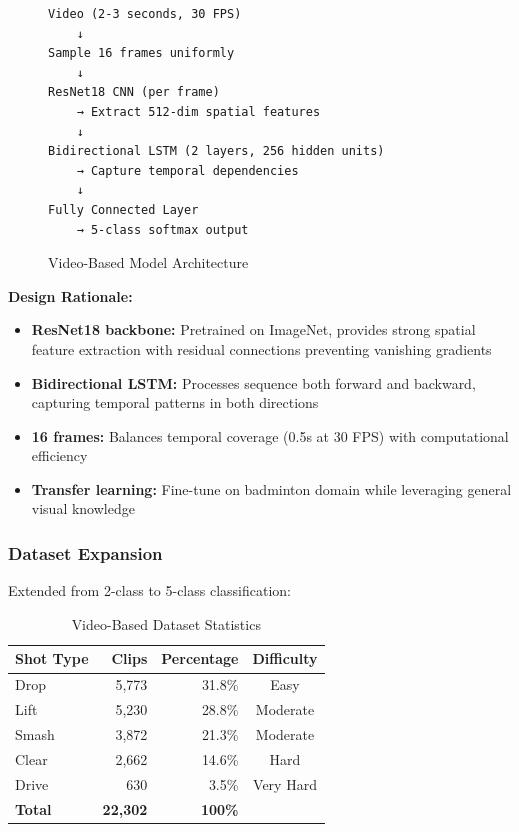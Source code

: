 \documentclass[12pt,a4paper]{article}
\begin{document}
\begin{figure}[H]
\centering
\begin{verbatim}
Video (2-3 seconds, 30 FPS)
    ↓
Sample 16 frames uniformly
    ↓
ResNet18 CNN (per frame)
    → Extract 512-dim spatial features
    ↓
Bidirectional LSTM (2 layers, 256 hidden units)
    → Capture temporal dependencies
    ↓
Fully Connected Layer
    → 5-class softmax output
\end{verbatim}
\caption{Video-Based Model Architecture}
\end{figure}

\textbf{Design Rationale:}
\begin{itemize}
\item \textbf{ResNet18 backbone:} Pretrained on ImageNet, provides strong spatial feature extraction with residual connections preventing vanishing gradients
\item \textbf{Bidirectional LSTM:} Processes sequence both forward and backward, capturing temporal patterns in both directions
\item \textbf{16 frames:} Balances temporal coverage (0.5s at 30 FPS) with computational efficiency
\item \textbf{Transfer learning:} Fine-tune on badminton domain while leveraging general visual knowledge
\end{itemize}

\subsubsection{Dataset Expansion}

Extended from 2-class to 5-class classification:

\begin{table}[H]
\centering
\caption{Video-Based Dataset Statistics}
\begin{tabular}{lrrc}
\toprule
Shot Type & Clips & Percentage & Difficulty \\
\midrule
Drop & 5,773 & 31.8\% & Easy \\
Lift & 5,230 & 28.8\% & Moderate \\
Smash & 3,872 & 21.3\% & Moderate \\
Clear & 2,662 & 14.6\% & Hard \\
Drive & 630 & 3.5\% & Very Hard \\
\midrule
\textbf{Total} & \textbf{22,302} & \textbf{100\%} & \\
\bottomrule
\end{tabular}
\end{table}
\end{document}
